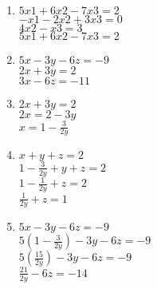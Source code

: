 \documentclass[12pt, a4paper, onecolumn, oneside, final, bahasa]{report}
\begin{document}
\begin{enumerate}
\def\labelenumi{\arabic{enumi}.}
\item
  \(5x1+6x2-7x3 = 2\)\\
  \(-x1-2x2+3x3 = 0\)\\
  \(4x2-x3 = 3\)\\
  \(5x1+6x2-7x3=2\)
\item
  \(5x-3y-6z = -9\)\\
  \(2x+3y = 2\)\\
  \(3x-6z = -11\)
\item
  \(2x+3y = 2\)\\
  \(2x = 2 - 3y\)\\
  \(x = 1 - \frac{3}{2y}\)
\item
  \(x+y+z = 2\)\\
  \(1-\frac{3}{2y}+y+z = 2\)\\
  \(1-\frac{1}{2y}+z = 2\)\\
  \(\frac{1}{2y}+z = 1\)
\item
  \(5x-3y-6z = -9\)\\
  \(5(1-\frac{3}{2y})-3y-6z = -9\)\\
  \(5(\frac{15}{2y})-3y-6z = -9\)\\
  \(\frac{21}{2y}-6z = -14\)
\end{enumerate}
\end{document}
